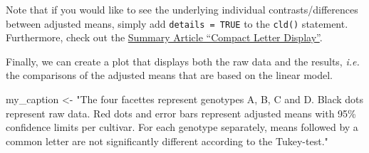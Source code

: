\documentclass[
  letterpaper,
  DIV=11,
  numbers=noendperiod]{scrartcl}
\newenvironment{Shaded}{\begin{snugshade}}{\end{snugshade}}
\newcommand{\NormalTok}[1]{\textcolor[rgb]{0.00,0.23,0.31}{#1}}
\newcommand{\OtherTok}[1]{\textcolor[rgb]{0.00,0.23,0.31}{#1}}
\newcommand{\StringTok}[1]{\textcolor[rgb]{0.13,0.47,0.30}{#1}}
\begin{document}
Note that if you would like to see the underlying individual
contrasts/differences between adjusted means, simply add
\texttt{details\ =\ TRUE} to the \texttt{cld()} statement. Furthermore,
check out the
\href{../../summaryarticles/compactletterdisplay.qmd}{Summary Article
``Compact Letter Display''}.

Finally, we can create a plot that displays both the raw data and the
results, \emph{i.e.} the comparisons of the adjusted means that are
based on the linear model.

\begin{Shaded}
\begin{Highlighting}[]
\NormalTok{my\_caption }\OtherTok{\textless{}{-}} \StringTok{"The four facettes represent genotypes A, B, C and D. Black dots represent raw data. Red dots and error bars represent adjusted means with 95\% confidence limits per cultivar. For each genotype separately, means followed by a common letter are not significantly different according to the Tukey{-}test."}


\end{Highlighting}
\end{Shaded}
\end{document}
